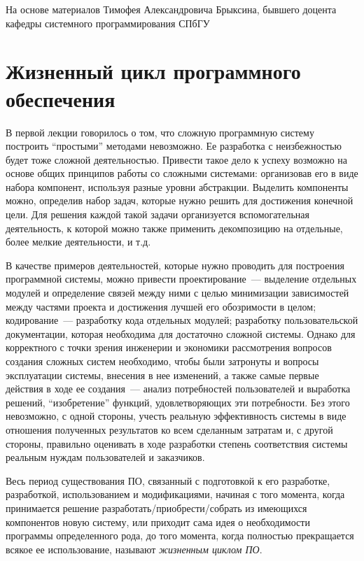 \documentclass{../../text-style}
\begin{document}
\maketitle
\thispagestyle{empty}

На основе материалов Тимофея Александровича Брыксина, бывшего доцента кафедры системного программирования СПбГУ

\section{Жизненный цикл программного обеспечения}

В первой лекции говорилось о том, что сложную программную систему построить \enquote{простыми} методами невозможно.
Ее разработка с неизбежностью будет тоже сложной деятельностью.
Привести такое дело к успеху возможно на основе общих принципов работы со сложными системами: организовав его в виде набора компонент, используя разные уровни абстракции.
Выделить компоненты можно, определив набор задач, которые нужно решить для достижения конечной цели.
Для решения каждой такой задачи организуется вспомогательная деятельность, к которой можно также применить декомпозицию на отдельные, более мелкие деятельности, и т.д.

В качестве примеров деятельностей, которые нужно проводить для построения программной системы, можно привести проектирование~--- выделение отдельных модулей и определение связей между ними с целью минимизации зависимостей между частями проекта и достижения лучшей его обозримости в целом; кодирование~--- разработку кода отдельных модулей; разработку пользовательской документации, которая необходима для достаточно сложной системы.
Однако для корректного с точки зрения инженерии и экономики рассмотрения вопросов создания сложных систем необходимо, чтобы были затронуты и вопросы эксплуатации системы, внесения в нее изменений, а также самые первые действия в ходе ее создания~--- анализ потребностей пользователей и выработка решений, \enquote{изобретение} функций, удовлетворяющих эти потребности.
Без этого невозможно, с одной стороны, учесть реальную эффективность системы в виде отношения полученных результатов ко всем сделанным затратам и, с другой стороны, правильно оценивать в ходе разработки степень соответствия системы реальным нуждам пользователей и заказчиков.

Весь период существования ПО, связанный с подготовкой к его разработке, разработкой, использованием и модификациями, начиная с того момента, когда принимается решение разработать/приобрести/собрать из имеющихся компонентов новую систему, или приходит сама идея о необходимости программы определенного рода, до того момента, когда полностью прекращается всякое ее использование, называют \emph{жизненным циклом ПО}.
\end{document}
